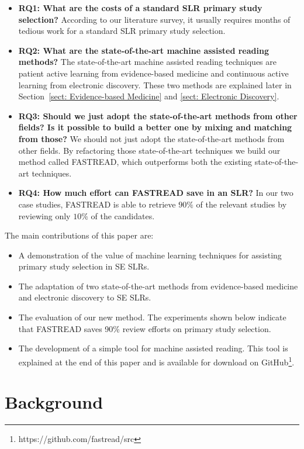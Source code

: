 \documentclass[final,twocolumn,5p]{elsarticle}
\theoremstyle{break}
\begin{document}
\begin{itemize}

\item
{\bf RQ1: What are the costs of a standard SLR primary study selection?} According to our literature survey, it usually requires months of tedious work for a standard SLR primary study selection.

\item
{\bf RQ2: What are the state-of-the-art machine assisted reading methods?} The
state-of-the-art machine assisted reading techniques are patient active learning
from evidence-based medicine and continuous active learning from electronic
discovery. These two methods are explained later in Section~\ref{sect: Evidence-based Medicine} and \ref{sect: Electronic Discovery}.

\item
{\bf RQ3: Should we just adopt the state-of-the-art methods from other fields? Is it possible to build a better one by mixing and matching from those?} We should not just adopt the state-of-the-art methods from other fields. By refactoring those state-of-the-art techniques we build our method called FASTREAD, which outperforms both the existing state-of-the-art techniques. 

\item
{\bf RQ4: How much effort can FASTREAD save in an SLR?} In our two case studies, FASTREAD is able to retrieve $90\%$ of the relevant studies by reviewing only $10\%$ of the candidates.


\end{itemize}
The main contributions of this paper are:
\begin{itemize}
\item
  A demonstration of the value of  machine learning techniques for assisting primary study selection in SE SLRs.
\item
  The adaptation of  two state-of-the-art methods
  from evidence-based medicine and electronic discovery to SE SLRs.
  
\item
  The evaluation of our new method.
  The experiments shown below indicate that FASTREAD
  saves 90\% review efforts on primary study selection.
\item The development of a simple tool for machine assisted reading.
  This tool is explained at the end of this paper and is
  available for download on GitHub\footnote{https://github.com/fastread/src}. 
\end{itemize}
\section{Background}
\label{sect: Background}
\end{document}
